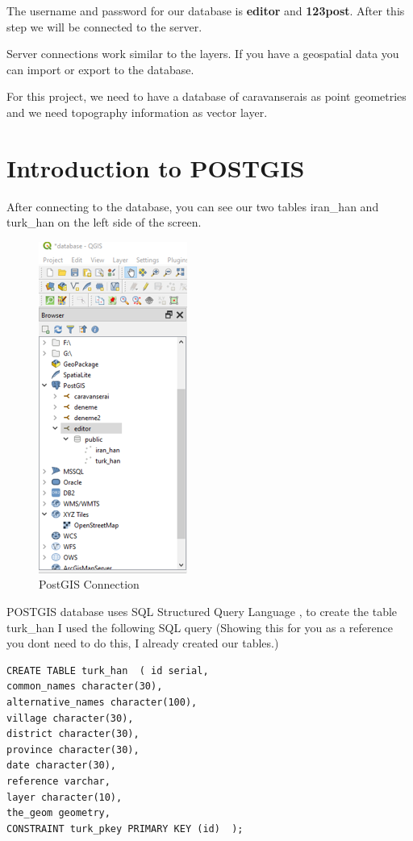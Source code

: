 \documentclass[
]{book}
\begin{document}
The username and password for our database is \textbf{editor} and \textbf{123post}. After this step we will be connected to the server.

Server connections work similar to the layers. If you have a geospatial data you can import or export to the database.

For this project, we need to have a database of caravanserais as point geometries and we need topography information as vector layer.

\hypertarget{introduction-to-postgis}{%
\section{Introduction to POSTGIS}\label{introduction-to-postgis}}

After connecting to the database, you can see our two tables iran\_han and turk\_han on the left side of the screen.

\begin{figure}
\centering
\includegraphics{Images/postgisConnection.png}
\caption{PostGIS Connection}
\end{figure}

POSTGIS database uses SQL Structured Query Language , to create the table turk\_han I used the following SQL query (Showing this for you as a reference you dont need to do this, I already created our tables.)

\begin{verbatim}
CREATE TABLE turk_han  ( id serial, 
common_names character(30),  
alternative_names character(100), 
village character(30), 
district character(30), 
province character(30), 
date character(30), 
reference varchar, 
layer character(10),  
the_geom geometry,    
CONSTRAINT turk_pkey PRIMARY KEY (id)  );
\end{verbatim}
\end{document}
